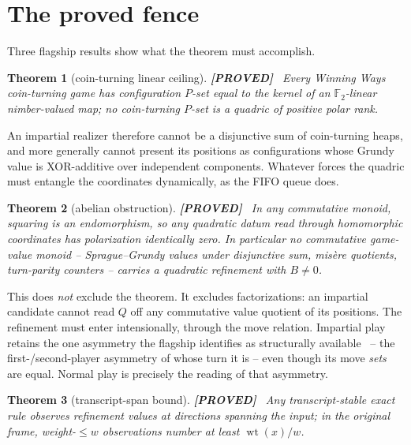\documentclass[11pt]{article}
\newtheorem{theorem}{Theorem}
\theoremstyle{definition}
\theoremstyle{remark}
\newcommand{\F}{\mathbb{F}}
\newcommand{\wt}{\operatorname{wt}}
\newcommand{\taglabel}[1]{\textnormal{\textbf{[#1]}}}
\newcommand{\PROVED}{\taglabel{PROVED}}
\begin{document}
\section{The proved fence}

Three flagship results show what the theorem must accomplish.

\begin{theorem}[coin-turning linear ceiling]\label{thm:ceiling}
\PROVED~\cite[Thm.~A]{goldarf}
Every Winning Ways coin-turning game has configuration $P$-set equal to
the kernel of an $\F_2$-linear nimber-valued map; no coin-turning $P$-set
is a quadric of positive polar rank.
\end{theorem}

An impartial realizer therefore cannot be a disjunctive sum of
coin-turning heaps, and more generally cannot present its positions as
configurations whose Grundy value is XOR-additive over independent
components.  Whatever forces the quadric must entangle the coordinates
dynamically, as the FIFO queue does.

\begin{theorem}[abelian obstruction]\label{thm:abelian}
\PROVED~\cite[Lem.~abelian, Thm.~B]{goldarf}
In any commutative monoid, squaring is an endomorphism, so any quadratic
datum read through homomorphic coordinates has polarization identically
zero.  In particular no commutative game-value monoid -- Sprague--Grundy
values under disjunctive sum, mis\`ere quotients, turn-parity counters --
carries a quadratic refinement with $B\neq0$.
\end{theorem}

This does \emph{not} exclude the theorem.  It excludes
factorizations: an impartial candidate cannot read $Q$ off any
commutative value quotient of its positions.  The refinement must enter
intensionally, through the move relation.  Impartial play retains the one
asymmetry the flagship identifies as structurally
available~\cite[Rem.~screen]{goldarf} -- the first-/second-player
asymmetry of whose turn it is -- even though its move \emph{sets} are
equal.  Normal play is precisely the reading of that asymmetry.

\begin{theorem}[transcript-span bound]\label{thm:span}
\PROVED~\cite[transcript-span theorem]{goldarf}
Any transcript-stable exact rule observes refinement values at directions
spanning the input; in the original frame, weight-$\leq w$ observations
number at least $\wt(x)/w$.
\end{theorem}
\end{document}
